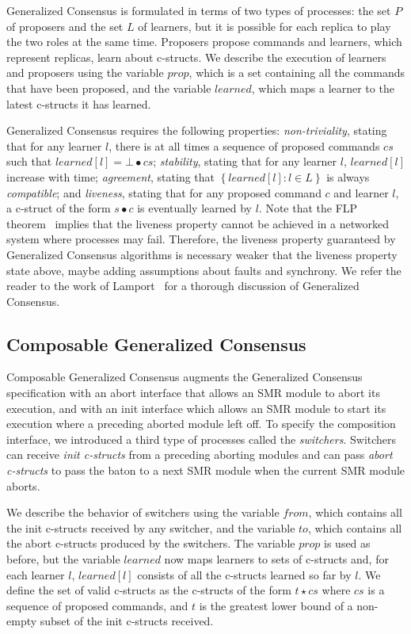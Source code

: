 Generalized Consensus is formulated in terms of two types of processes: the set $P$ of proposers and the set $L$ of learners, but it is possible for each replica to play the two roles at the same time. Proposers propose commands and learners, which represent replicas, learn about c-structs.
We describe the execution of learners and proposers using the variable $prop$, which is a set containing all the commands that have been proposed, and the variable $learned$, which maps a learner to the latest c-structs it has learned.

Generalized Consensus requires the following properties: \emph{non-triviality}, stating that for any learner $l$, there is at all times a sequence of proposed commands $cs$ such that $learned\left[l\right] = \bot \bullet cs$; \emph{stability}, stating that for any learner $l$, $learned\left[ l \right]$ increase with time; \emph{agreement}, stating that $\left\{ learned\left[ l \right] :  l \in L\right\}$ is always \emph{compatible}; and \emph{liveness}, stating that for any proposed command $c$ and learner $l$, a c-struct of the form $s\bullet c$ is eventually learned by $l$.
Note that the FLP theorem~\cite{FischerLynchPaterson83ImpossibilityDistributedConsensusOneFaultyProcess} implies that the liveness property cannot be achieved in a networked system where processes may fail. Therefore, the liveness property guaranteed by Generalized Consensus algorithms is necessary weaker that the liveness property state above, maybe adding assumptions about faults and synchrony.
We refer the reader to the work of Lamport~\cite{Lamport05GeneralizeConsensus} for a thorough discussion of Generalized Consensus.

\subsection{Composable Generalized Consensus}

Composable Generalized Consensus augments the Generalized Consensus specification with an abort interface that allows an SMR module to abort its execution, and with an init interface which allows an SMR module to start its execution where a preceding aborted module left off.
To specify the composition interface, we introduced a third type of processes called the \emph{switchers}. Switchers can receive \emph{init c-structs} from a preceding aborting modules and can pass \emph{abort c-structs} to pass the baton to a next SMR module when the current SMR module aborts.

We describe the behavior of switchers using the variable $from$, which contains all the init c-structs received by any switcher, and the variable $to$, which contains all the abort c-structs produced by the switchers.
The variable $prop$ is used as before, but the variable $learned$ now maps learners to sets of c-structs and, for each learner $l$, $learned\left[ l \right]$ consists of all the c-structs learned so far by $l$.
We define the set of valid c-structs as the c-structs of the form $t\star cs$ where $cs$ is a sequence of proposed commands, and $t$ is the greatest lower bound of a non-empty subset of the init c-structs received.

